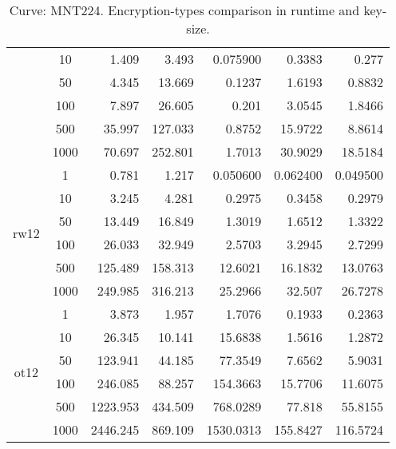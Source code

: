 \documentclass[twoside,11pt,titlepage,a4paper,english,bibliography=totocnumbered,listof=numbered]{scrbook}
\begin{document}
\begin{table}[ht]
{\begin{tabular}{|c|c|r|r|r|r|r|}
&10&    1.409    &    3.493    &    0.075900 &    0.3383   &    0.277     \\
&50&    4.345    &   13.669    &    0.1237   &    1.6193   &    0.8832    \\
&100&    7.897    &   26.605    &    0.201    &    3.0545   &    1.8466    \\
&500&   35.997    &  127.033    &    0.8752   &   15.9722   &    8.8614    \\
&1000&   70.697    &  252.801    &    1.7013   &   30.9029   &   18.5184    \\
\hline
\multirow{6}{*}{rw12} &1&    0.781    &    1.217    &    0.050600 &    0.062400 &    0.049500  \\
&10&    3.245    &    4.281    &    0.2975   &    0.3458   &    0.2979    \\
&50&   13.449    &   16.849    &    1.3019   &    1.6512   &    1.3322    \\
&100&   26.033    &   32.949    &    2.5703   &    3.2945   &    2.7299    \\
&500&  125.489    &  158.313    &   12.6021   &   16.1832   &   13.0763    \\
&1000&  249.985    &  316.213    &   25.2966   &   32.507    &   26.7278    \\
\hline
\multirow{6}{*}{ot12} &1&    3.873    &    1.957    &    1.7076   &    0.1933   &    0.2363    \\
&10&   26.345    &   10.141    &   15.6838   &    1.5616   &    1.2872    \\
&50&  123.941    &   44.185    &   77.3549   &    7.6562   &    5.9031    \\
&100&  246.085    &   88.257    &  154.3663   &   15.7706   &   11.6075    \\
&500& 1223.953    &  434.509    &  768.0289   &   77.818    &   55.8155    \\
&1000& 2446.245    &  869.109    & 1530.0313   &  155.8427   &  116.5724    \\
\hline
\end{tabular}}\caption{Curve: MNT224. Encryption-types comparison in runtime and key-size.}\label{table:abe_run_MNT224} \end{table} 
\end{document}
